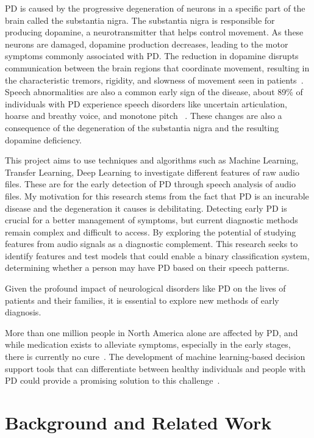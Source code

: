 \documentclass{paper}
\begin{document}
PD is caused by the progressive degeneration of neurons in a specific part of the brain called the substantia nigra. The substantia nigra is responsible for producing dopamine, a neurotransmitter that helps control movement. As these neurons are damaged, dopamine production decreases, leading to the motor symptoms commonly associated with PD. The reduction in dopamine disrupts communication between the brain regions that coordinate movement, resulting in the characteristic tremors, rigidity, and slowness of movement seen in patients~\cite{ahmed2022classification}. Speech abnormalities are also a common early sign of the disease, about 89\% of individuals with PD experience speech disorders like uncertain articulation, hoarse and breathy voice, and monotone pitch ~\cite{ahmed2022classification}. These changes are also a consequence of the degeneration of the substantia nigra and the resulting dopamine deficiency.

This project aims to use techniques and algorithms such as Machine Learning, Transfer Learning, Deep Learning to investigate different features of raw audio files. These are for the early detection of PD through speech analysis of audio files. My motivation for this research stems from the fact that PD is an incurable disease and the degeneration it causes is debilitating. Detecting early PD is crucial for a better management of symptoms, but current diagnostic methods remain complex and difficult to access. By exploring the potential of studying features from audio signals as a diagnostic complement. This research seeks to identify features and test models that could enable a binary classification system, determining whether a person may have PD based on their speech patterns.

Given the profound impact of neurological disorders like PD on the lives of patients and their families, it is essential to explore new methods of early diagnosis. 

More than one million people in North America alone are affected by PD, and while medication exists to alleviate symptoms, especially in the early stages, there is currently no cure~\cite{ae1998parkinson, singh2007advances}. The development of machine learning-based decision support tools that can differentiate between healthy individuals and people with PD could provide a promising solution to this challenge~\cite{little2008suitability, sapir2010formant}.


\section{Background and Related Work}
\end{document}
